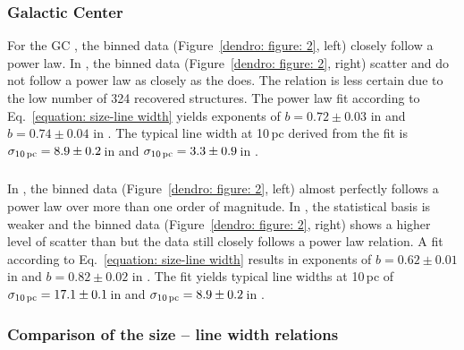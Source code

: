 \subsubsection{Galactic Center}
\label{dendro: section: size line width: GC}

For the GC , the binned data (Figure~\ref{dendro: figure: 2}, left) closely follow a power law. In , the binned data (Figure~\ref{dendro: figure: 2}, right) scatter and do not follow a power law as closely as the  does. The  relation is less certain due to the low number of 324 recovered structures.
The power law fit according to Eq.~\ref{equation: size-line width} yields exponents of $b=0.72 \pm 0.03$ in  and $b=0.74 \pm 0.04$ in . 
The typical line width at 10\,pc derived from the fit is $\sigma_\mathrm{10\,pc} = 8.9 \pm 0.2$\,\kms in  and $\sigma_\mathrm{10\,pc} = 3.3\pm0.9$\,\kms in .


\subsubsection{}
\label{dendro: section: size line width: ngc253}

In , the binned  data (Figure~\ref{dendro: figure: 2}, left) almost perfectly follows a power law over more than one order of magnitude. In , the statistical basis is weaker and the binned data (Figure~\ref{dendro: figure: 2}, right) shows a higher level of scatter than  but the data still closely follows a power law relation.
A fit according to Eq.~\ref{equation: size-line width} results in exponents of $b=0.62 \pm 0.01$ in  and $b=0.82 \pm 0.02$ in . 
The fit yields typical line widths at 10\,pc of $\sigma_\mathrm{10\,pc} = 17.1 \pm 0.1$\,\kms in  and $\sigma_\mathrm{10\,pc} = 8.9 \pm 0.2$\,\kms in .


\subsubsection{Comparison of the size -- line width relations}
\label{dendro: section: size line width: comparison}

